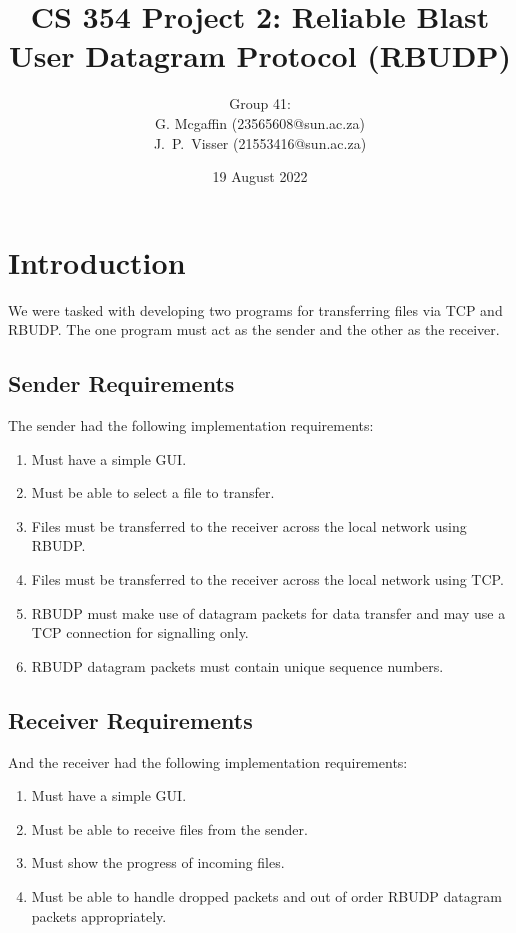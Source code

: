 \documentclass[10pt, a4paper]{article}
\title{CS 354 Project 2: Reliable Blast User Datagram Protocol (RBUDP)}
\author{Group 41: \vspace{0.5em} \\
        G. Mcgaffin (23565608@sun.ac.za) \vspace{0.3em} \\
        J.\ P.\ Visser (21553416@sun.ac.za)}
\date{\vspace{1em} 19 August 2022}
\begin{document}
\maketitle
\newpage

\tableofcontents
\newpage


\section{Introduction}
\label{sec:intro}

We were tasked with developing two programs for transferring files via TCP and
RBUDP. The one program must act as the sender and the other as the receiver.

\subsection{Sender Requirements}
\label{subsec:sender-req}

The sender had the following implementation requirements:
\begin{enumerate}
  \item Must have a simple GUI.
  \item Must be able to select a file to transfer.
  \item Files must be transferred to the receiver across the local network using
    RBUDP.
  \item Files must be transferred to the receiver across the local network using
    TCP.
  \item RBUDP must make use of datagram packets for data transfer and may use a
    TCP connection for signalling only.
  \item RBUDP datagram packets must contain unique sequence numbers.
\end{enumerate}

\subsection{Receiver Requirements}
\label{subsec:receiver-req}

And the receiver had the following implementation requirements:
\begin{enumerate}
  \item Must have a simple GUI.
  \item Must be able to receive files from the sender.
  \item Must show the progress of incoming files.
  \item Must be able to handle dropped packets and out of order RBUDP datagram
    packets appropriately.
\end{enumerate}
\end{document}

